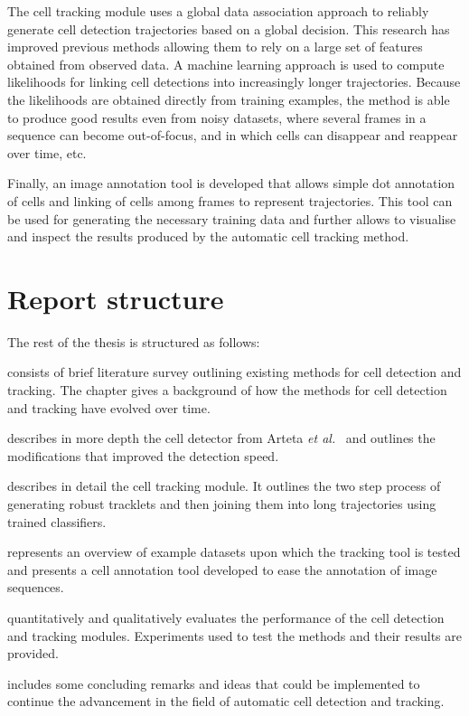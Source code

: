 		The cell tracking module uses a global data association approach to reliably generate cell detection trajectories based on a global decision. This research has improved previous methods allowing them to rely on a large set of features obtained from observed data. A machine learning approach is used to compute likelihoods for linking cell detections into increasingly longer trajectories. Because the likelihoods are obtained directly from training examples, the method is able to produce good results even from noisy datasets, where several frames in a sequence can become out-of-focus, and in which cells can disappear and reappear over time, etc.
		
		Finally, an image annotation tool is developed that allows simple dot annotation of cells and linking of cells among frames to represent trajectories. This tool can be used for generating the necessary training data and further allows to visualise and inspect the results produced by the automatic cell tracking method.
		
	\section{Report structure}
		The rest of the thesis is structured as follows:
		
		 consists of brief literature survey outlining existing methods for cell detection and tracking. The chapter gives a background of how the methods for cell detection and tracking have evolved over time.
		
		 describes in more depth the cell detector from Arteta \emph{et al.}~\cite{arteta12} and outlines the modifications that improved the detection speed.
		
		 describes in detail the cell tracking module. It outlines the two step process of generating robust tracklets and then joining them into long trajectories using trained classifiers.
	
		 represents an overview of example datasets upon which the tracking tool is tested and presents a cell annotation tool developed to ease the annotation of image sequences.
		
		 quantitatively and qualitatively evaluates the performance of the cell detection and tracking modules. Experiments used to test the methods and their results are provided.
		
		 includes some concluding remarks and ideas that could be implemented to continue the advancement in the field of automatic cell detection and tracking.
